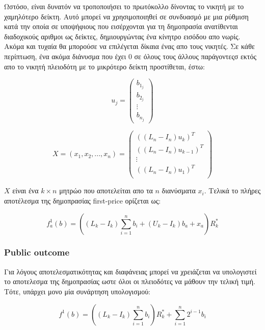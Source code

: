 \documentclass[a4paper,11pt]{article}
\begin{document}
Ωστόσο, είναι δυνατόν να τροποποιήσει το πρωτόκολλο δίνοντας το νικητή με το χαμηλότερο δείκτη. Αυτό μπορεί να χρησιμοποιηθεί σε συνδυασμό με μια
ρύθμιση κατά την οποία σε υποψήφιους που εισέρχονται για τη δημοπρασία ανατίθενται διαδοχικούς αριθμοι ως δείκτες, δημιουργώντας ένα κίνητρο
εισόδου απο νωρίς. Ακόμα και τυχαία θα μπορούσε να επιλέγεται δίκαια ένας απο τους νικητές. Σε κάθε περίπτωση, ένα ακόμα διάνυσμα που έχει 0 σε
όλους τους άλλους παράγοντεςσ εκτός απο το νικητή πλειοδότη με το μικρότερο δείκτη προστίθεται, έστω:

\begin{displaymath}
	u_j =
	\left ( \begin{array}{c}
		b_{1_j} \\
		b_{2_j} \\
		\vdots	\\
		b_{n_j}
	\end{array} \right)	
\end{displaymath}

\begin{displaymath}
	X = (x_1, x_2,..., x_n) =
	\left ( \begin{array}{c}
		((L_n - I_n)u_k)^T \\
		((L_n - I_n)u_{k-1})^T \\
		\vdots \\
		((L_n - I_n)u_1)^T \\
	\end{array} \right)
\end{displaymath}

$X$ είναι ένα $k × n$ μητρώο που αποτελείται απο τα $n$ διανύσματα $x_i$. Τελικά το πλήρες αποτέλεσμα της δημοπρασίας first-price ορίζεται ως:

\begin{displaymath}
	f^1_a(b) = \left ( (L_k - I_k) \sum_{i=1}^{n} b_i + (U_k - I_k) b_a + x_a \right ) R^*_k
\end{displaymath}

\subsubsection{Public outcome} Για λόγους αποτελεσματικότητας και διαφάνειας μπορεί να χρειάζεται να υπολογιστεί το αποτελεσμα της δημοπρασίας ωστε
όλοι οι πλειοδότες να μάθουν την τελική τιμή. Τότε, υπάρχει μονο μία συνάρτηση υπολογισμού:

\begin{displaymath}
	f^1(b) = \left ( (L_k - I_k) \sum_{i=1}^{n} b_i \right ) R^*_k + \sum_{i=1}^{n} 2^{i-1} b_i
\end{displaymath}
\end{document}
